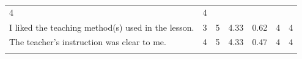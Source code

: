 \documentclass[paper=a4,justified,a4paper]{tufte-handout}
\begin{document}
\begin{longtable}[]{@{}lllllll@{}}
\begin{minipage}[t]{0.13\columnwidth}
4\strut
\end{minipage} & \begin{minipage}[t]{0.09\columnwidth}\raggedright
4\strut
\end{minipage}\tabularnewline
\begin{minipage}[t]{0.18\columnwidth}\raggedright
\scriptsize I liked the teaching method(s) used in the lesson.\strut
\end{minipage} & \begin{minipage}[t]{0.07\columnwidth}\raggedright
3\strut
\end{minipage} & \begin{minipage}[t]{0.07\columnwidth}\raggedright
5\strut
\end{minipage} & \begin{minipage}[t]{0.09\columnwidth}\raggedright
4.33\strut
\end{minipage} & \begin{minipage}[t]{0.18\columnwidth}\raggedright
0.62\strut
\end{minipage} & \begin{minipage}[t]{0.13\columnwidth}\raggedright
4\strut
\end{minipage} & \begin{minipage}[t]{0.09\columnwidth}\raggedright
4\strut
\end{minipage}\tabularnewline
\begin{minipage}[t]{0.18\columnwidth}\raggedright
\scriptsize The teacher's instruction was clear to me.\strut
\end{minipage} & \begin{minipage}[t]{0.07\columnwidth}\raggedright
4\strut
\end{minipage} & \begin{minipage}[t]{0.07\columnwidth}\raggedright
5\strut
\end{minipage} & \begin{minipage}[t]{0.09\columnwidth}\raggedright
4.33\strut
\end{minipage} & \begin{minipage}[t]{0.18\columnwidth}\raggedright
0.47\strut
\end{minipage} & \begin{minipage}[t]{0.13\columnwidth}\raggedright
4\strut
\end{minipage} & \begin{minipage}[t]{0.09\columnwidth}\raggedright
4\strut
\end{minipage}\tabularnewline
\begin{minipage}[t]{0.18\columnwidth}\raggedright

\end{minipage}
\end{longtable}
\end{document}
